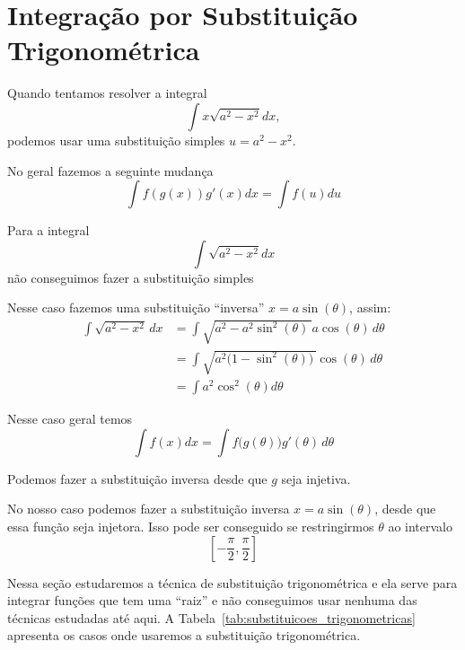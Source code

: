 \section{Integração por Substituição Trigonométrica}
\label{sec:Integracao_substituicao_Trigonometrica}

Quando tentamos resolver a integral
\[
  \int x \sqrt{a^2-x^2}dx,
\]
podemos usar uma substituição simples $u=a^2-x^2$.

No geral fazemos a seguinte mudança
\[
  \int f(g(x))g'(x) dx= \int f(u)du
\]

Para a integral
\[
  \int \sqrt{a^2-x^2}dx
\]
não conseguimos fazer a substituição simples

Nesse caso fazemos uma substituição ``inversa''
$x=a\sin( \theta )$, assim:
\begin{align*}
  \int \sqrt{a^2-x^2}\,dx
  & = \int \sqrt{a^2-a^2 \sin^2(\theta)\,} a\cos(\theta) \,d\theta \\
  & = \int \sqrt{a^2\big(1-\sin^2(\theta)\big)\,}   \cos(\theta) \,d\theta \\
  & = \int a^2 \cos^2 (\theta) d\theta
\end{align*}

Nesse caso geral temos
\[
  \int f(x)dx= \int f\big(g(\theta)\big) g'(\theta) \,d\theta
\]

Podemos fazer a substituição inversa desde que $g$ seja injetiva.

No nosso caso  podemos fazer a substituição inversa $x=a\sin(\theta)$,
desde que essa função seja injetora. Isso pode ser conseguido se
restringirmos $\theta$ ao intervalo
\[
  \left[-\frac{\pi}{2}, \frac{\pi}{2}\right]
\]

Nessa seção estudaremos a técnica de substituição trigonométrica e ela serve
para integrar funções que tem uma ``raiz'' e não conseguimos usar nenhuma das
técnicas estudadas até aqui. A Tabela~\ref{tab:substituicoes_trigonometricas}
apresenta os casos onde usaremos a substituição trigonométrica.

